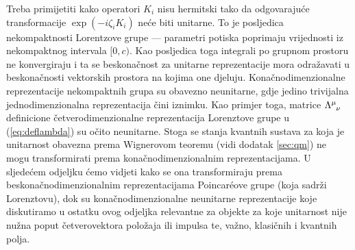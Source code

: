 Treba primijetiti kako operatori $K_i$ nisu hermitski tako da odgovarajuće
transformacije $\exp(-i\zeta_i K_i)$ neće biti unitarne. To je posljedica
nekompaktnosti Lorentzove grupe --- parametri potiska poprimaju
vrijednosti iz nekompaktnog intervala $[0,c)$.
Kao posljedica toga integrali po grupnom prostoru ne konvergiraju i ta se beskonačnost
za unitarne reprezentacije mora odražavati u beskonačnosti vektorskih prostora
na kojima one djeluju. Konačnodimenzionalne reprezentacije nekompaktnih grupa
su obavezno neunitarne, gdje jedino trivijalna jednodimenzionalna reprezentacija
čini iznimku. Kao primjer toga, matrice $\tensor{\Lambda}{^\mu_\nu}$
definicione četverodimenzionalne reprezentacija Lorenztove grupe u (\ref{eq:deflambda}) 
su očito neunitarne. Stoga se stanja kvantnih sustava za koja je 
unitarnost obavezna prema Wignerovom teoremu (vidi dodatak \ref{sec:qm}) ne mogu transformirati
prema konačnodimenzionalnim reprezentacijama. U sljedećem odjeljku ćemo
vidjeti kako se ona transformiraju prema beskonačnodimenzionalnim
reprezentacijama Poincar\'{e}ove grupe (koja sadrži Lorenztovu),
dok su konačnodimenzionalne neunitarne reprezentacije koje diskutiramo
u ostatku ovog odjeljka relevantne za objekte za koje unitarnost
nije nužna poput četverovektora položaja ili impulsa te, važno, klasičnih
i kvantnih polja.


